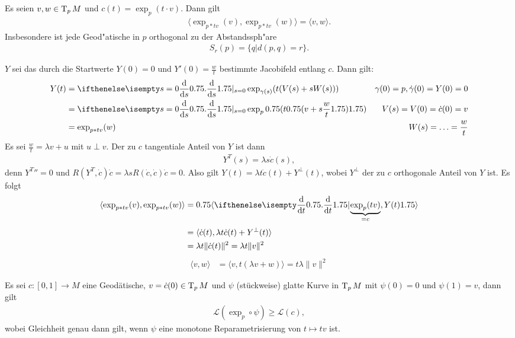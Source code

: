 \begin{Lemma}
  Es seien $v, w \in \operatorname{T}_pM$ und $c(t) = \exp_p(t \cdot v)$. Dann gilt
  \begin{align*}
    \langle \exp_{p*tv}(v), \exp_{p*tv}(w) \rangle = \langle v, w \rangle.
  \end{align*}
  Insbesondere ist jede Geod"atische in $p$ orthogonal zu der Abstandssph"are
  \begin{align*}
    S_r(p) = \{ q | d(p, q) = r \}.
  \end{align*}
\end{Lemma}

\begin{bew}
  $Y$ sei das durch die Startwerte $Y(0) = 0$ und $Y'(0) = \frac{w}{t}$ bestimmte Jacobifeld entlang $c$. Dann gilt:
  \begin{align*}
    Y(t) &= \difffrac[s=0]{}{s} \exp_{\gamma(s)}(t(V(s) + sW(s))) & \gamma(0) = p, \dot\gamma(0) = Y(0) = 0\\
    &= \difffrac[s=0]{}{s} \exp_p\left(t \left(v + s \frac{w}{t}\right)\right) & V(s) = V(0) = \dot c(0) = v\\
    &= \exp_{p*tv}(w) & W(s) = \ldots = \frac{w}{t}
  \end{align*}
  Es sei $\frac{w}{t} = \lambda v + u$ mit $u \perp v$. Der zu $c$ tangentiale Anteil von $Y$ ist dann
  \begin{align*}
    Y^T(s) = \lambda s \dot c (s),
  \end{align*}
  denn ${Y^T}{''} = 0$ und $R(Y^T, \dot c) \dot c = \lambda s R(\dot c, \dot c) \dot c = 0$.
  Also gilt $Y(t) = \lambda t \dot c(t) + Y^\perp(t)$, wobei $Y^\perp$ der zu $c$ orthogonale Anteil von $Y$ ist. Es folgt
  \begin{align*}
    \langle \exp_{p*tv}(v), \exp_{p*tv}(w) \rangle &= \left\langle \difffrac{}{t} \smash{\underbrace{\exp_p(tv)}_{=c}}, Y(t) \right\rangle \vphantom{\underbrace{\difffrac{}{}}_{a}} \\
    &= \langle \dot c(t), \lambda t \dot c(t) + Y^\perp(t) \rangle \\
    &= \lambda t \|\dot c(t) \|^2 = \lambda t \|v\|^2 \\
  \end{align*}
  \begin{align*}
    \langle v, w \rangle &= \langle v, t(\lambda v + w) \rangle = t \lambda \|v\|^2
  \end{align*}
\end{bew}

\begin{Lemma}\label{thm:lemma-9-10}
  Es sei $c \colon [0,1] \to M$ eine Geodätische, $v = \dot c(0) \in \operatorname{T}_{p}M$ und $\psi$ (stückweise) glatte Kurve in $\operatorname{T}_pM$ mit $\psi(0) = 0$ und $\psi(1) = v$, dann gilt
  \begin{align*}
    \mathcal L(\exp_p \circ \psi) \geq \mathcal L(c),
  \end{align*}
  wobei Gleichheit genau dann gilt, wenn $\psi$ eine monotone Reparametrisierung von $t \mapsto tv$ ist.
\end{Lemma}

